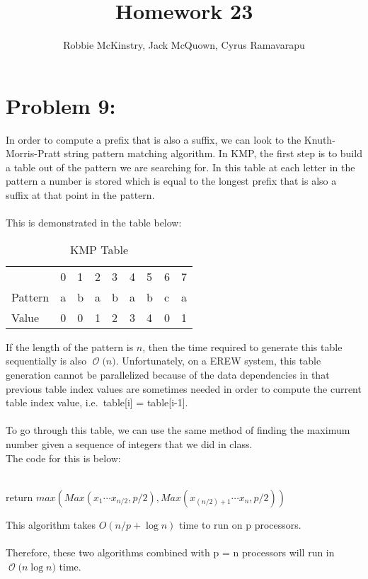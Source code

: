 \documentclass[12pt]{article}
\newcommand{\BigO}[1]{\ensuremath{\operatorname{\mathcal{O}}\bigl(#1\bigr)}}
\begin{document}
\title{Homework 23}
\author{Robbie McKinstry, Jack McQuown, Cyrus Ramavarapu}
\renewcommand{\today}{25 October 2016}
\renewcommand{\baselinestretch}{1.5}
\maketitle

\section*{Problem 9: }
In order to compute a prefix that is also a suffix, we can look to the Knuth-Morris-Pratt string pattern matching algorithm. In KMP, the first step is to build a table out of the pattern we are searching for. In this table at each letter in the pattern a number is stored which is equal to the longest prefix that is also a suffix at that point in the pattern.\\\\
This is demonstrated in the table below:\\
\begin{table}[H]
\centering
\caption{KMP Table}
\label{my-label}
\begin{tabular}{lllllllll}
                             & 0 & 1 & 2 & 3 & 4 & 5 & 6 & 7 \\ \cline{2-9} 
\multicolumn{1}{l|}{Pattern} & a & b & a & b & a & b & c & a \\
\multicolumn{1}{l|}{Value}   & 0 & 0 & 1 & 2 & 3 & 4 & 0 & 1
\end{tabular}
\end{table}
If the length of the pattern is {$n$}, then the time required to generate this table sequentially is also \BigO{n}. Unfortunately, on a EREW system, this table generation cannot be parallelized because of the data dependencies in that previous table index values are sometimes needed in order to compute the current table index value, i.e.\ table[i] = table[i-1].\\\\
To go through this table, we can use the same method of finding the maximum number given a sequence of integers that we did in class.\\
The code for this is below:\\\\
\begin{algorithm}[H]
return {$max (Max(x_1 \cdots x_{n/2}, p/2), Max(x_{(n/2) +1} \cdots x_n, p/2))$}
\end{algorithm}
This algorithm takes {$O(n/p + \log n)$} time to run on p processors.\\\\
Therefore, these two algorithms combined with p = n processors will run in \BigO{n\log n} time.
\end{document}
